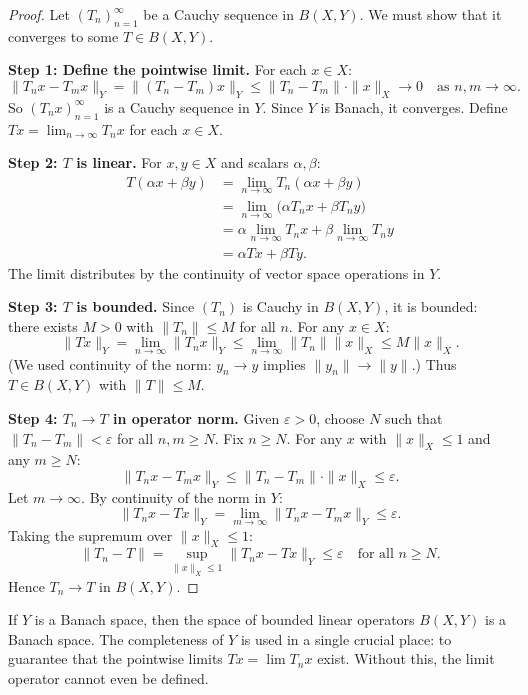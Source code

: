 \documentclass[11pt,a4paper]{article}
\begin{document}
\begin{proof}
Let $(T_n)_{n=1}^\infty$ be a Cauchy sequence in $B(X,Y)$. We must show that
it converges to some $T \in B(X,Y)$.

\textbf{Step 1: Define the pointwise limit.}
For each $x \in X$:
\[
\|T_n x - T_m x\|_Y = \|(T_n - T_m)x\|_Y \le \|T_n - T_m\| \cdot \|x\|_X
\to 0 \quad \text{as } n, m \to \infty.
\]
So $(T_n x)_{n=1}^\infty$ is a Cauchy sequence in $Y$. Since $Y$ is Banach,
it converges. Define $Tx = \lim_{n \to \infty} T_n x$ for each $x \in X$.

\textbf{Step 2: $T$ is linear.}
For $x, y \in X$ and scalars $\alpha, \beta$:
\begin{align*}
T(\alpha x + \beta y) &= \lim_{n \to \infty} T_n(\alpha x + \beta y) \\
&= \lim_{n \to \infty} \bigl(\alpha T_n x + \beta T_n y\bigr) \\
&= \alpha \lim_{n \to \infty} T_n x + \beta \lim_{n \to \infty} T_n y \\
&= \alpha Tx + \beta Ty.
\end{align*}
The limit distributes by the continuity of vector space operations in $Y$.

\textbf{Step 3: $T$ is bounded.}
Since $(T_n)$ is Cauchy in $B(X,Y)$, it is bounded: there exists $M > 0$
with $\|T_n\| \le M$ for all $n$. For any $x \in X$:
\[
\|Tx\|_Y = \lim_{n \to \infty} \|T_n x\|_Y \le \lim_{n \to \infty}
\|T_n\| \|x\|_X \le M \|x\|_X.
\]
(We used continuity of the norm: $y_n \to y$ implies $\|y_n\| \to \|y\|$.)
Thus $T \in B(X,Y)$ with $\|T\| \le M$.

\textbf{Step 4: $T_n \to T$ in operator norm.}
Given $\varepsilon > 0$, choose $N$ such that $\|T_n - T_m\| < \varepsilon$
for all $n, m \ge N$. Fix $n \ge N$. For any $x$ with $\|x\|_X \le 1$ and
any $m \ge N$:
\[
\|T_n x - T_m x\|_Y \le \|T_n - T_m\| \cdot \|x\|_X \le \varepsilon.
\]
Let $m \to \infty$. By continuity of the norm in $Y$:
\[
\|T_n x - Tx\|_Y = \lim_{m \to \infty} \|T_n x - T_m x\|_Y \le \varepsilon.
\]
Taking the supremum over $\|x\|_X \le 1$:
\[
\|T_n - T\| = \sup_{\|x\|_X \le 1} \|T_n x - Tx\|_Y \le \varepsilon
\quad \text{for all } n \ge N.
\]
Hence $T_n \to T$ in $B(X,Y)$.
\end{proof}

\begin{keyresult}[title={$B(X,Y)$ Inherits Completeness from $Y$}]
If $Y$ is a Banach space, then the space of bounded linear operators
$B(X,Y)$ is a Banach space. The completeness of $Y$ is used in a single
crucial place: to guarantee that the pointwise limits $Tx = \lim T_n x$
exist. Without this, the limit operator cannot even be defined.
\end{keyresult}
\end{document}
